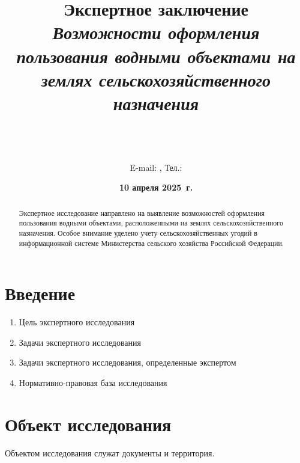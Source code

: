 \title{
    \LARGE\textbf{Экспертное заключение} \\
    \large\textit{Возможности оформления пользования водными объектами на землях сельскохозяйственного назначения}
}

\author{
    \small\textbf{\ExpertName} \\[4pt]
    \small \ExpertPosition \\
    \small \OrganizationName \\
    \small {E-mail: \OrganizationEmail}, \small {Тел.: \OrganizationPhone}
}

\date{
    \small\textbf{10 апреля 2025~г.} \\[4pt]
}

\pagestyle{fancy}
\maketitle

\begin{abstract}
Экспертное исследование направлено на выявление возможностей оформления пользования водными объектами, расположенными на землях сельскохозяйственного назначения. Особое внимание уделено учету сельскохозяйственных угодий в информационной системе Министерства сельского хозяйства Российской Федерации. 
\end{abstract}

\tableofcontents

\section{Введение}
\label{sec:intro}

\begin{enumerate}
    \item[] Цель экспертного исследования
    \item[] Задачи экспертного исследования
    \item[] Задачи экспертного исследования, определенные экспертом 
    \item[] Нормативно-правовая база исследования
\end{enumerate}

\section{Объект исследования}
\label{sec:obj}
Объектом исследования служат документы и территория. 

